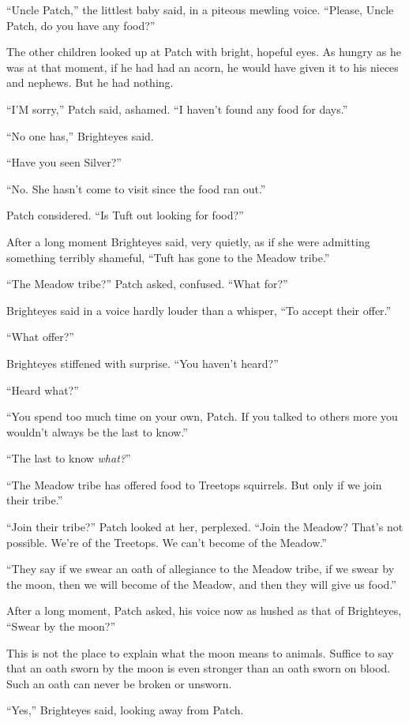 \documentclass[12pt]{memoir}
\begin{document}
“Uncle Patch,” the littlest baby said, in a piteous mewling
voice. “Please, Uncle Patch, do you have any food?”

The other children looked up at Patch with bright, hopeful eyes. As
hungry as he was at that moment, if he had had an acorn, he would have
given it to his nieces and nephews. But he had nothing.

“I’M sorry,” Patch said, ashamed. “I haven’t found any food for days.”

“No one has,” Brighteyes said.

“Have you seen Silver?”

“No. She hasn’t come to visit since the food ran out.”

Patch considered. “Is Tuft out looking for food?”

After a long moment Brighteyes said, very quietly, as if she were
admitting something terribly shameful, “Tuft has gone to the Meadow
tribe.”

“The Meadow tribe?” Patch asked, confused. “What for?”

Brighteyes said in a voice hardly louder than a whisper, “To accept
their offer.”

“What offer?”

Brighteyes stiffened with surprise. “You haven’t heard?”

“Heard what?”

“You spend too much time on your own, Patch. If you talked to others
more you wouldn’t always be the last to know.”

“The last to know \textit{what?}”

“The Meadow tribe has offered food to Treetops squirrels. But only if
we join their tribe.”

“Join their tribe?” Patch looked at her, perplexed. “Join the Meadow?
That’s not possible. We’re of the Treetops. We can’t become of the
Meadow.”

“They say if we swear an oath of allegiance to the Meadow tribe, if we
swear by the moon, then we will become of the Meadow, and then they
will give us food.”

After a long moment, Patch asked, his voice now as hushed as that of
Brighteyes, “Swear by the moon?”

This is not the place to explain what the moon means to
animals. Suffice to say that an oath sworn by the moon is even
stronger than an oath sworn on blood. Such an oath can never be broken
or unsworn.

“Yes,” Brighteyes said, looking away from Patch.
\end{document}
